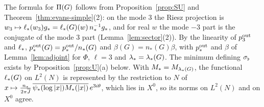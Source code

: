 The formula for $\Pi(G)$ follows from Proposition~\ref{prop:SU} and
Theorem~\ref{thm:evans-simple}(2): on the mode $3$ the Riesz projection is
$w_3\mapsto\ell_*(w_3)g_*=\ell_*(G)(w)\,n_*^{-1}g_*$, and for real $w$ the mode
$-3$ part is the conjugate of the mode $3$ part (Lemma~\ref{lem:sector}(2)). By
the linearity of $p^{\mathrm{out}}_3$ and $\ell_*$, $p^{\mathrm{out}}_*(G)=p^{\mathrm{out}}_*/n_*(G)$ and
$\beta(G)=n_*(G)\beta$, with $p^{\mathrm{out}}_*$ and $\beta$ of Lemma~\ref{lem:adjoint} for
$\Phi$, $\ell=3$ and $\lambda_*=\lambda_*(G)$. The minimum defining $\sigma_\flat$
exists by Proposition~\ref{prop:U}(a) below. With $M_*=M_{\lambda_*(G)}$, the
functional $\ell_*(G)$ on $L^2(N)$ is represented by the restriction to $N$ of
$x\mapsto\frac{n_*}{2\pi\overline{J}}\,\overline{\psi_*(\log|x|)M_*(|x|)}\,e^{3i\theta}$,
which lies in $X^0$, so its norms on $L^2(N)$ and on $X^0$ agree.

